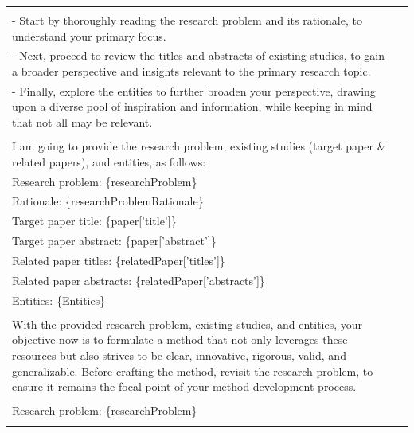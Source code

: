 \documentclass[11pt]{article}
\begin{document}
\begin{table}
{\begin{tabular}{ll}
{            \multicolumn{1}{p{.92\textwidth}}{{Your approach should be systematic:}} \\ 
            \multicolumn{1}{p{.92\textwidth}}{{- Start by thoroughly reading the research problem and its rationale, to understand your primary focus.}} \\
            \multicolumn{1}{p{.92\textwidth}}{{- Next, proceed to review the titles and abstracts of existing studies, to gain a broader perspective and insights relevant to the primary research topic.}} \\
            \multicolumn{1}{p{.92\textwidth}}{{- Finally, explore the entities to further broaden your perspective, drawing upon a diverse pool of inspiration and information, while keeping in mind that not all may be relevant.}} \\ \\
            \multicolumn{1}{p{.92\textwidth}}{{I am going to provide the research problem, existing studies (target paper \& related papers), and entities, as follows: }} \\
            \multicolumn{1}{p{.92\textwidth}}{{Research problem: \{researchProblem\}}} \\
            \multicolumn{1}{p{.92\textwidth}}{{Rationale: \{researchProblemRationale\}}} \\
            \multicolumn{1}{p{.92\textwidth}}{{Target paper title: \{paper['title']\}}} \\
            \multicolumn{1}{p{.92\textwidth}}{{Target paper abstract: \{paper['abstract']\} }} \\
            \multicolumn{1}{p{.92\textwidth}}{{Related paper titles: \{relatedPaper['titles']\}}} \\
            \multicolumn{1}{p{.92\textwidth}}{{Related paper abstracts: \{relatedPaper['abstracts']\} }} \\
            \multicolumn{1}{p{.92\textwidth}}{{Entities: \{Entities\} }} \\ \\
            \multicolumn{1}{p{.92\textwidth}}{{With the provided research problem, existing studies, and entities, your objective now is to formulate a method that not only leverages these resources but also strives to be clear, innovative, rigorous, valid, and generalizable. Before crafting the method, revisit the research problem, to ensure it remains the focal point of your method development process.}} \\ \\
            \multicolumn{1}{p{.92\textwidth}}{{Research problem: \{researchProblem\}}} \\
}
\end{tabular}}
\end{table}
\end{document}
